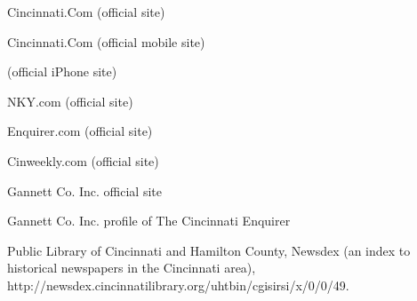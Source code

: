 Cincinnati.Com (official site)

Cincinnati.Com (official mobile site)

(official iPhone site)

NKY.com (official site)

Enquirer.com (official site)

Cinweekly.com (official site)

Gannett Co. Inc. official site

Gannett Co. Inc. profile of The Cincinnati Enquirer

Public Library of Cincinnati and Hamilton County, Newsdex (an index to
historical newspapers in the Cincinnati area),
http://newsdex.cincinnatilibrary.org/uhtbin/cgisirsi/x/0/0/49.
